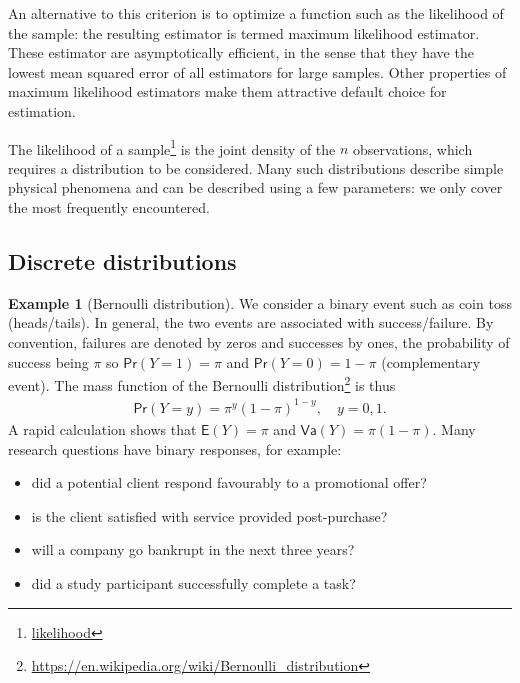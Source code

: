 \documentclass[
  11pt,
  letterpaper,
]{book}
\providecommand{\tightlist}{%
  \setlength{\itemsep}{0pt}\setlength{\parskip}{0pt}}
\renewcommand{\href}[2]{#2\footnote{\url{#1}}}
\theoremstyle{definition}
\theoremstyle{definition}
\newtheorem{example}{Example}[chapter]
\theoremstyle{definition}
\theoremstyle{remark}
\begin{document}
An alternative to this criterion is to optimize a function such as the likelihood of the sample: the resulting estimator is termed maximum likelihood estimator. These estimator are asymptotically efficient, in the sense that they have the lowest mean squared error of all estimators for large samples. Other properties of maximum likelihood estimators make them attractive default choice for estimation.

The \href{likelihood}{likelihood of a sample} is the joint density of the \(n\) observations, which requires a distribution to be considered. Many such distributions describe simple physical phenomena and can be described using a few parameters: we only cover the most frequently encountered.

\hypertarget{discrete-distributions}{%
\subsection{Discrete distributions}\label{discrete-distributions}}

\begin{example}[Bernoulli distribution]
\protect\hypertarget{exm:bernoullidist}{}{\label{exm:bernoullidist} {} }We consider a binary event such as coin toss (heads/tails). In general, the two events are associated with success/failure. By convention, failures are denoted by zeros and successes by ones, the probability of success being \(\pi\) so \(\mathsf{Pr}(Y=1)=\pi\) and \(\mathsf{Pr}(Y=0)=1-\pi\) (complementary event). The mass function of the \href{https://en.wikipedia.org/wiki/Bernoulli_distribution}{Bernoulli distribution} is thus
\begin{align*}
\mathsf{Pr}(Y=y) = \pi^y (1-\pi)^{1-y}, \quad y=0, 1.
\end{align*}
A rapid calculation shows that \(\mathsf{E}(Y)=\pi\) and \(\mathsf{Va}(Y)=\pi(1-\pi)\).
Many research questions have binary responses, for example:

\begin{itemize}
\tightlist
\item
  did a potential client respond favourably to a promotional offer?
\item
  is the client satisfied with service provided post-purchase?
\item
  will a company go bankrupt in the next three years?
\item
  did a study participant successfully complete a task?
\end{itemize}
\end{example}
\end{document}
